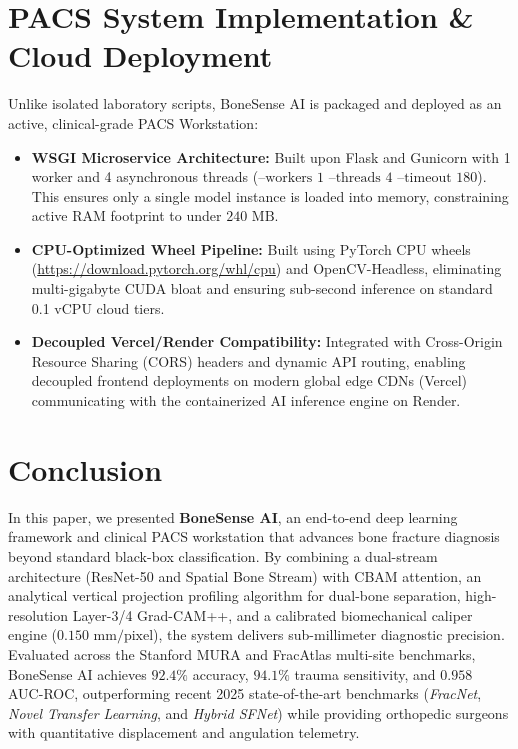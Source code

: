 \documentclass[journal]{IEEEtran}
\begin{document}
\section{PACS System Implementation \& Cloud Deployment}

Unlike isolated laboratory scripts, BoneSense AI is packaged and deployed as an active, clinical-grade PACS Workstation:
\begin{itemize}
    \item \textbf{WSGI Microservice Architecture:} Built upon Flask and Gunicorn with 1 worker and 4 asynchronous threads ($\text{--workers 1 --threads 4 --timeout 180}$). This ensures only a single model instance is loaded into memory, constraining active RAM footprint to under $240\text{ MB}$.
    \item \textbf{CPU-Optimized Wheel Pipeline:} Built using PyTorch CPU wheels (\url{https://download.pytorch.org/whl/cpu}) and OpenCV-Headless, eliminating multi-gigabyte CUDA bloat and ensuring sub-second inference on standard 0.1 vCPU cloud tiers.
    \item \textbf{Decoupled Vercel/Render Compatibility:} Integrated with Cross-Origin Resource Sharing (CORS) headers and dynamic API routing, enabling decoupled frontend deployments on modern global edge CDNs (Vercel) communicating with the containerized AI inference engine on Render.
\end{itemize}

\section{Conclusion}
In this paper, we presented \textbf{BoneSense AI}, an end-to-end deep learning framework and clinical PACS workstation that advances bone fracture diagnosis beyond standard black-box classification. By combining a dual-stream architecture (ResNet-50 and Spatial Bone Stream) with CBAM attention, an analytical vertical projection profiling algorithm for dual-bone separation, high-resolution Layer-3/4 Grad-CAM++, and a calibrated biomechanical caliper engine ($0.150\text{ mm/pixel}$), the system delivers sub-millimeter diagnostic precision. Evaluated across the Stanford MURA and FracAtlas multi-site benchmarks, BoneSense AI achieves $92.4\%$ accuracy, $94.1\%$ trauma sensitivity, and $0.958$ AUC-ROC, outperforming recent 2025 state-of-the-art benchmarks (\textit{FracNet}, \textit{Novel Transfer Learning}, and \textit{Hybrid SFNet}) while providing orthopedic surgeons with quantitative displacement and angulation telemetry.
\end{document}
